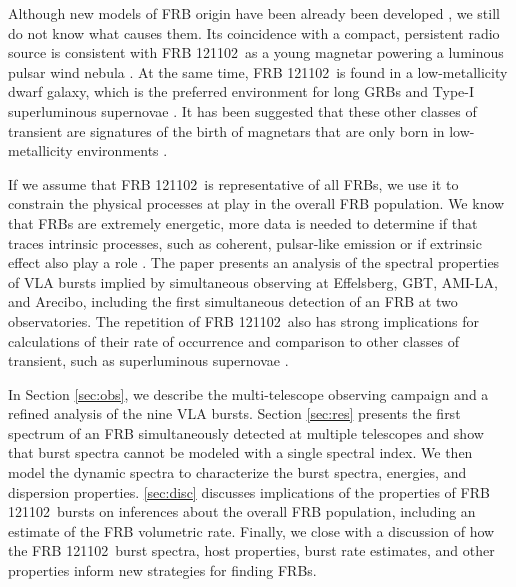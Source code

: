 \documentclass[twocolumn]{aastex61}
\newcommand{\frb}{FRB 121102}
\begin{document}
Although new models of FRB origin have been already been developed \citep{2017arXiv170104815K, 2017arXiv170102370M, 2017arXiv170104094Z, 2017arXiv170102492D}, we still do not know what causes them. Its coincidence with a compact, persistent radio source is consistent with \frb\ as a young magnetar powering a luminous pulsar wind nebula \citep{2017arXiv170104815K}. At the same time, \frb\ is found in a low-metallicity dwarf galaxy, which is the preferred environment for long GRBs and Type-I superluminous supernovae \citep[LGRB and SLSN-I, respectively;][]{2017arXiv170102370M}. It has been suggested that these other classes of transient are signatures of the birth of magnetars that are only born in low-metallicity environments \citep{2014ApJ...787..138L}.


If we assume that \frb\ is representative of all FRBs, we use it to constrain the physical processes at play in the overall FRB population. We know that FRBs are extremely energetic, more data is needed to determine if that traces intrinsic processes, such as coherent, pulsar-like emission \citep{2014PhRvD..89j3009K, 2014ApJ...785L..26L, 2016MNRAS.457..232C} or if extrinsic effect also play a role \citep{2015MNRAS.451.3278M, CORDES}. The paper presents an analysis of the spectral properties of VLA bursts implied by simultaneous observing at Effelsberg, GBT, AMI-LA, and Arecibo, including the first simultaneous detection of an FRB at two observatories. The repetition of \frb\ also has strong implications for calculations of their rate of occurrence \citep{2016MNRAS.458L..89C} and comparison to other classes of transient, such as superluminous supernovae \citep{OPT}.

In Section \ref{sec:obs}, we describe the multi-telescope observing campaign and a refined analysis of the nine VLA bursts. Section \ref{sec:res} presents the first spectrum of an FRB simultaneously detected at multiple telescopes and show that burst spectra cannot be modeled with a single spectral index. We then model the dynamic spectra to characterize the burst spectra, energies, and dispersion properties.
\ref{sec:disc} discusses implications of the properties of \frb\ bursts on inferences about the overall FRB population, including an estimate of the FRB volumetric rate. Finally, we close with a discussion of how the \frb\ burst spectra, host properties, burst rate estimates, and other properties inform new strategies for finding FRBs.
\end{document}

